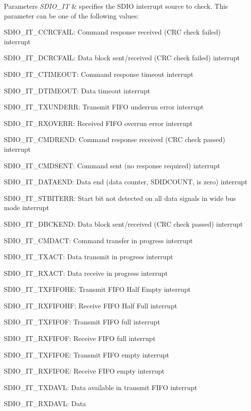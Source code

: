 \begin{DoxyParams}{Parameters}
{\em S\+D\+I\+O\+\_\+\+IT} & specifies the S\+D\+IO interrupt source to check. This parameter can be one of the following values\+: \begin{DoxyItemize}
\item S\+D\+I\+O\+\_\+\+I\+T\+\_\+\+C\+C\+R\+C\+F\+A\+IL\+: Command response received (C\+RC check failed) interrupt \item S\+D\+I\+O\+\_\+\+I\+T\+\_\+\+D\+C\+R\+C\+F\+A\+IL\+: Data block sent/received (C\+RC check failed) interrupt \item S\+D\+I\+O\+\_\+\+I\+T\+\_\+\+C\+T\+I\+M\+E\+O\+UT\+: Command response timeout interrupt \item S\+D\+I\+O\+\_\+\+I\+T\+\_\+\+D\+T\+I\+M\+E\+O\+UT\+: Data timeout interrupt \item S\+D\+I\+O\+\_\+\+I\+T\+\_\+\+T\+X\+U\+N\+D\+E\+RR\+: Transmit F\+I\+FO underrun error interrupt \item S\+D\+I\+O\+\_\+\+I\+T\+\_\+\+R\+X\+O\+V\+E\+RR\+: Received F\+I\+FO overrun error interrupt \item S\+D\+I\+O\+\_\+\+I\+T\+\_\+\+C\+M\+D\+R\+E\+ND\+: Command response received (C\+RC check passed) interrupt \item S\+D\+I\+O\+\_\+\+I\+T\+\_\+\+C\+M\+D\+S\+E\+NT\+: Command sent (no response required) interrupt \item S\+D\+I\+O\+\_\+\+I\+T\+\_\+\+D\+A\+T\+A\+E\+ND\+: Data end (data counter, S\+D\+I\+D\+C\+O\+U\+NT, is zero) interrupt \item S\+D\+I\+O\+\_\+\+I\+T\+\_\+\+S\+T\+B\+I\+T\+E\+RR\+: Start bit not detected on all data signals in wide bus mode interrupt \item S\+D\+I\+O\+\_\+\+I\+T\+\_\+\+D\+B\+C\+K\+E\+ND\+: Data block sent/received (C\+RC check passed) interrupt \item S\+D\+I\+O\+\_\+\+I\+T\+\_\+\+C\+M\+D\+A\+CT\+: Command transfer in progress interrupt \item S\+D\+I\+O\+\_\+\+I\+T\+\_\+\+T\+X\+A\+CT\+: Data transmit in progress interrupt \item S\+D\+I\+O\+\_\+\+I\+T\+\_\+\+R\+X\+A\+CT\+: Data receive in progress interrupt \item S\+D\+I\+O\+\_\+\+I\+T\+\_\+\+T\+X\+F\+I\+F\+O\+HE\+: Transmit F\+I\+FO Half Empty interrupt \item S\+D\+I\+O\+\_\+\+I\+T\+\_\+\+R\+X\+F\+I\+F\+O\+HF\+: Receive F\+I\+FO Half Full interrupt \item S\+D\+I\+O\+\_\+\+I\+T\+\_\+\+T\+X\+F\+I\+F\+OF\+: Transmit F\+I\+FO full interrupt \item S\+D\+I\+O\+\_\+\+I\+T\+\_\+\+R\+X\+F\+I\+F\+OF\+: Receive F\+I\+FO full interrupt \item S\+D\+I\+O\+\_\+\+I\+T\+\_\+\+T\+X\+F\+I\+F\+OE\+: Transmit F\+I\+FO empty interrupt \item S\+D\+I\+O\+\_\+\+I\+T\+\_\+\+R\+X\+F\+I\+F\+OE\+: Receive F\+I\+FO empty interrupt \item S\+D\+I\+O\+\_\+\+I\+T\+\_\+\+T\+X\+D\+A\+VL\+: Data available in transmit F\+I\+FO interrupt \item S\+D\+I\+O\+\_\+\+I\+T\+\_\+\+R\+X\+D\+A\+VL\+: Data 
\end{DoxyItemize}
\end{DoxyParams}
